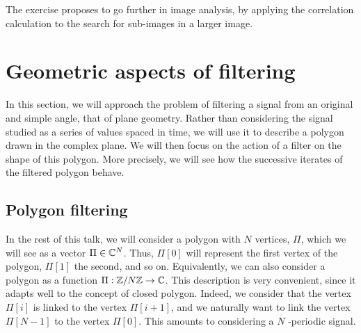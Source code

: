 The exercise  proposes to go further in image analysis, by applying the correlation calculation to the search for sub-images in a larger image.
\section{Geometric aspects of filtering}
\label{sect1-aspect-geometriques} 
 
In this section, we will approach the problem of filtering a signal from an original and simple angle, that of plane geometry. Rather than considering the signal studied as a series of values spaced in time, we will use it to describe a polygon drawn in the complex plane. We will then focus on the action of a filter on the shape of this polygon. More precisely, we will see how the successive iterates of the filtered polygon behave.
\subsection{Polygon filtering}
\label{sect2-filtering-polygons} 
 
 
  In the rest of this talk, we will consider a polygon with $ N $ vertices, $ \Pi $, which we will see as a vector $ \Pi \in \mathbb{C}^N $. Thus, $ \Pi [0] $ will represent the first vertex of the polygon, $ \Pi [1] $ the second, and so on. Equivalently, we can also consider a polygon as a function $ \Pi: \mathbb{Z}/N \mathbb{Z} \rightarrow \mathbb{C} $. This description is very convenient, since it adapts well to the concept of closed polygon. Indeed, we consider that the vertex $ \Pi [i] $ is linked to the vertex $ \Pi [i + 1] $, and we naturally want to link the vertex $ \Pi [N-1] $ to the vertex $ \Pi [0] $. This amounts to considering a $ N $ -periodic signal.
 
